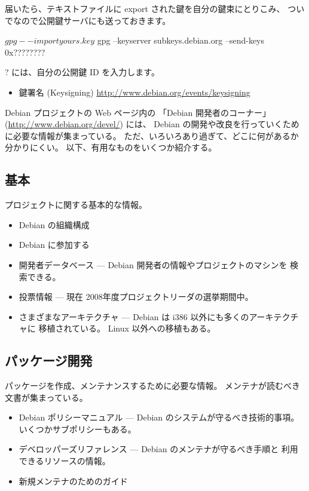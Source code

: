 \documentclass[mingoth,a4paper]{jsarticle}
\begin{document}
届いたら、テキストファイルに export された鍵を自分の鍵束にとりこみ、
ついでなので公開鍵サーバにも送っておきます。
\begin{commandline}
$ gpg --import yours.key
$ gpg --keyserver subkeys.debian.org --send-keys 0x????????
\end{commandline}

? には、自分の公開鍵 ID を入力します。

\begin{itemize}
 \item 鍵署名 (Keysigning) \url{http://www.debian.org/events/keysigning}
\end{itemize}


Debian プロジェクトの Web ページ内の
「Debian 開発者のコーナー」(\url{http://www.debian.org/devel/}) には、
Debian の開発や改良を行っていくために必要な情報が集まっている。
ただ、いろいろあり過ぎて、どこに何があるか分かりにくい。
以下、有用なものをいくつか紹介する。

\subsection{基本}

プロジェクトに関する基本的な情報。
\begin{itemize}
\item Debian の組織構成
\item Debian に参加する
\item 開発者データベース --- Debian 開発者の情報やプロジェクトのマシンを
  検索できる。
\item 投票情報 --- 現在 2008年度プロジェクトリーダの選挙期間中。
\item さまざまなアーキテクチャ --- Debian は i386 以外にも多くのアーキテクチャに
  移植されている。
  Linux 以外への移植もある。
\end{itemize}

\subsection{パッケージ開発}

パッケージを作成、メンテナンスするために必要な情報。
メンテナが読むべき文書が集まっている。

\begin{itemize}
\item Debian ポリシーマニュアル --- Debian のシステムが守るべき技術的事項。
  いくつかサブポリシーもある。
\item デベロッパーズリファレンス --- Debian のメンテナが守るべき手順と
  利用できるリソースの情報。
\item 新規メンテナのためのガイド
\end{itemize}
\end{document}
